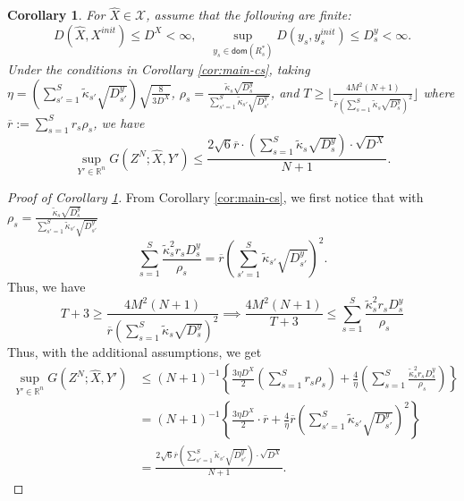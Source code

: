 \documentclass[10pt]{article}
\newcommand{\mc}{\mathcal}
\newcommand{\R}{\mathbb{R}}
\newcommand{\domain}{\mathsf{dom}}
\newtheorem{corollary}{Corollary}[section]
\begin{document}
\begin{corollary}\label{cor:main} 
For $\widehat{X}\in {\mc X}$, assume that the following are finite:
\begin{displaymath}
  D(\widehat{X},X^{init})\leq D^X<\infty,\quad  \sup_{y_s\in \domain(R^*_s)}D (y_s,y_s^{init})\leq D_s^y<\infty. 
\end{displaymath}
Under the conditions in Corollary \ref{cor:main-cs}, taking $\eta = (\sum_{s'=1}^S \widetilde{\kappa}_{s'}\sqrt{D_{s'}^y})\sqrt{\frac{8}{3D^X}}$, $\rho_s = \frac{\widetilde{\kappa}_s\sqrt{D_s^y}}{\sum_{s'=1}^S \widetilde{\kappa}_{s'}\sqrt{D_{s'}^y}}$, and $T \geq \lfloor \frac{4M^2(N+1)}{\overline{r}(\sum_{s=1}^S \widetilde{\kappa}_{s}\sqrt{D_{s}^y})^2}\rfloor$ where $\overline{r}:=\sum_{s=1}^S r_s\rho_s$, we have
\begin{equation}\label{eq:main3}
    \sup_{Y'\in \R^n}G(Z^N;\widehat{X},Y') \leq \frac{2\sqrt{6}\overline{r}\cdot (\sum_{s=1}^S \widetilde{\kappa}_{s}\sqrt{D_{s}^y})\cdot \sqrt{D^X}}{N+1}. 
\end{equation}
    

\end{corollary}
\begin{proof}[Proof of Corollary \ref{cor:main}]
From Corollary \ref{cor:main-cs}, we first notice that with $\rho_s = \frac{\widetilde{\kappa}_s\sqrt{D_s^y}}{\sum_{s'=1}^S \widetilde{\kappa}_{s'}\sqrt{D_{s'}^y}}$ 
\begin{displaymath}
    \sum_{s=1}^S \frac{\widetilde{\kappa}_s^2r_sD_s^y}{\rho_s} = \overline{r}(\sum_{s'=1}^S \widetilde{\kappa}_{s'}\sqrt{D_{s'}^y})^2. 
\end{displaymath}
Thus, we have
\begin{displaymath}
    T +3 \geq \frac{4M^2(N+1)}{\overline{r}(\sum_{s=1}^S \widetilde{\kappa}_{s}\sqrt{D_{s}^y})^2} \implies \frac{4M^2(N+1)}{T+3} \leq \sum_{s=1}^S \frac{\widetilde{\kappa}_s^2r_sD_s^y}{\rho_s}
\end{displaymath}
Thus, with the additional assumptions, we get 
\begin{align*}
    \sup_{Y'\in  \R^n}G(Z^N;\widehat{X},Y')&
     \leq (N+1)^{-1}\left\{\frac{3\eta D^X}{2}(\sum_{s=1}^S r_s\rho_s) + \frac{4}{\eta}(\sum_{s=1}^S \frac{\widetilde{\kappa}_s^2r_sD_s^y}{\rho_s})\right\}\\
     &= (N+1)^{-1}\left\{\frac{3\eta D^X}{2}\cdot \overline{r} + \frac{4}{\eta}\overline{r}(\sum_{s'=1}^S \widetilde{\kappa}_{s'}\sqrt{D_{s'}^y})^2\right\}\\
     & = \frac{2\sqrt{6}\overline{r}(\sum_{s'=1}^S \widetilde{\kappa}_{s'}\sqrt{D_{s'}^y})\cdot \sqrt{D^X}}{N+1}.
\end{align*}

\end{proof}
\end{document}
